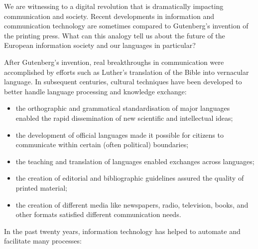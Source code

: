 \clearpage


\begin{multicols}{2}

We are witnessing to a digital revolution that is dramatically impacting communication and society. Recent developments in information and communication technology are sometimes compared to Gutenberg’s invention of the printing press. What can this analogy tell us about the future of the European information society and our languages in particular?


After Gutenberg’s invention, real breakthroughs in communication were accomplished by efforts such as Luther’s translation of the Bible into vernacular language. In subsequent centuries, cultural techniques have been developed to better handle language processing and knowledge exchange:

\begin{itemize}
\item the orthographic and grammatical standardisation of major languages enabled the rapid dissemination of new scientific and intellectual ideas;
\item the development of official languages made it possible for citizens to communicate within certain (often political) boundaries;
\item the teaching and translation of languages enabled exchanges across languages;
\item the creation of editorial and bibliographic guidelines assured the quality of printed material;
\item the creation of different media like newspapers, radio, television, books, and other formats satisfied different communication needs. 
\end{itemize}

In the past twenty years, information technology has helped to automate and facilitate many processes:


\end{multicols}

